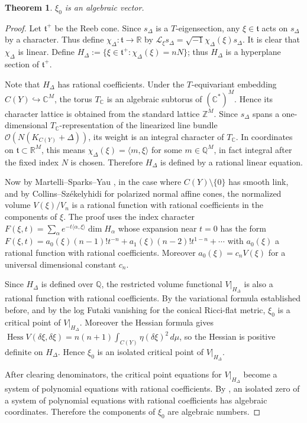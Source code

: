 \documentclass[11pt]{amsart}
\newtheorem{theorem}{Theorem}[section]
\theoremstyle{definition}
\theoremstyle{remark}
\begin{document}
\begin{theorem}
$\xi_0$ is an algebraic vector.
\end{theorem}

\begin{proof}
Let $\mathfrak t^+$ be the Reeb cone. Since $s_\Delta$ is a $T$-eigensection, any $\xi\in\mathfrak t$ acts on $s_\Delta$ by a character. Thus define $\chi_\Delta:\mathfrak t\to\mathbb R$ by $\mathcal L_\xi s_\Delta=\sqrt{-1}\chi_\Delta(\xi)s_\Delta$. It is clear that $\chi_\Delta$ is linear. Define $H_\Delta:=\{\xi\in\mathfrak t^+:\chi_\Delta(\xi)=nN\}$; thus $H_\Delta$ is a hyperplane section of $\mathfrak t^+$.

Note that $H_\Delta$ has rational coefficients. Under the $T$-equivariant embedding $C(Y)\hookrightarrow\mathbb C^M$, the torus $T_\mathbb C$ is an algebraic subtorus of $(\mathbb C^*)^M$. Hence its character lattice is obtained from the standard lattice $\mathbb Z^M$. Since $s_\Delta$ spans a one-dimensional $T_\mathbb C$-representation of the linearized line bundle $\mathcal O(N(K_{C(Y)}+\Delta))$, its weight is an integral character of $T_\mathbb C$. In coordinates on $\mathfrak t\subset \mathbb R^M$, this means $\chi_\Delta(\xi)=\langle m,\xi\rangle$ for some $m\in \mathbb Q^M$, in fact integral after the fixed index $N$ is chosen. Therefore $H_\Delta$ is defined by a rational linear equation.

Now by Martelli--Sparks--Yau \cite[Section~5]{MartelliSparksYau}, in the case
where $C(Y)\setminus\{0\}$ has smooth link, and by Collins--Sz\'ekelyhidi
\cite[Section~2]{CollinsSzekelyhidi} for polarized normal affine cones, the
normalized volume $V(\xi)/V_n$ is a rational function with rational coefficients
in the components of $\xi$. The proof uses the index character $F(\xi,t)=\sum_{\alpha} e^{-t\langle\alpha,\xi\rangle}\dim H_\alpha$ whose expansion near $t=0$ has the form $F(\xi,t)=a_0(\xi)(n-1)!t^{-n}+a_1(\xi)(n-2)!t^{1-n}+\cdots$
with $a_0(\xi)$ a rational function with rational coefficients. Moreover
$a_0(\xi)=c_nV(\xi)$ for a universal dimensional constant $c_n$.

Since $H_\Delta$ is defined over $\mathbb Q$, the restricted volume functional $V|_{H_\Delta}$ is also a rational function with rational coefficients. By the variational formula established before, and by the log Futaki vanishing for the conical Ricci-flat metric, $\xi_0$ is a critical point of $V|_{H_\Delta}$. Moreover the Hessian formula gives $\operatorname{Hess}V(\delta\xi,\delta\xi)=n(n+1)\int_{C(Y)}\eta(\delta\xi)^2\,d\mu$, so the Hessian is positive definite on $H_\Delta$. Hence $\xi_0$ is an isolated critical point of $V|_{H_\Delta}$.

After clearing denominators, the critical point equations for $V|_{H_\Delta}$ become a system of polynomial equations with rational coefficients. By \cite[Lemma 4.6]{DSII}, an isolated zero of a system of polynomial equations with rational coefficients has algebraic coordinates. Therefore the components of $\xi_0$ are algebraic numbers.
\end{proof}
\end{document}
